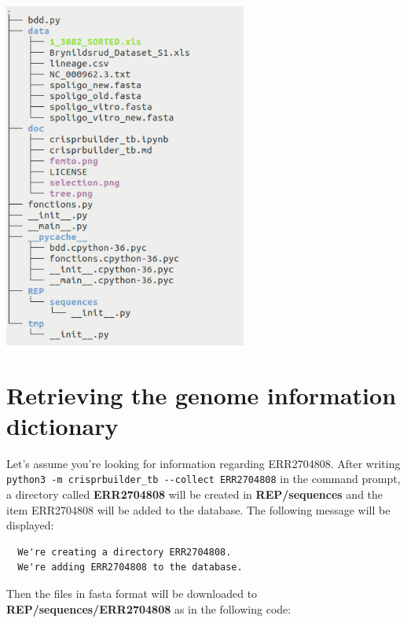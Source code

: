 \documentclass[twoside,a4paper,11pt,frenchb,openany]{report}
\begin{document}
\includegraphics[width=8cm]{rep_crispr.png}



    \section{Retrieving the genome information
dictionary}\label{retrieving-the-genome-information-dictionary}

    Let's assume you're looking for information regarding ERR2704808. After
writing \texttt{python3\ -m\ crisprbuilder\_tb\ -\/-collect\ ERR2704808}
in the command prompt, a directory called \textbf{ERR2704808} will be
created in \textbf{REP/sequences} and the item ERR2704808 will be added
to the database. The following message will be displayed:

    \begin{verbatim}
  We're creating a directory ERR2704808.
  We're adding ERR2704808 to the database.
\end{verbatim}

    Then the files in fasta format will be downloaded to
\textbf{REP/sequences/ERR2704808} as in the following code:
\end{document}
